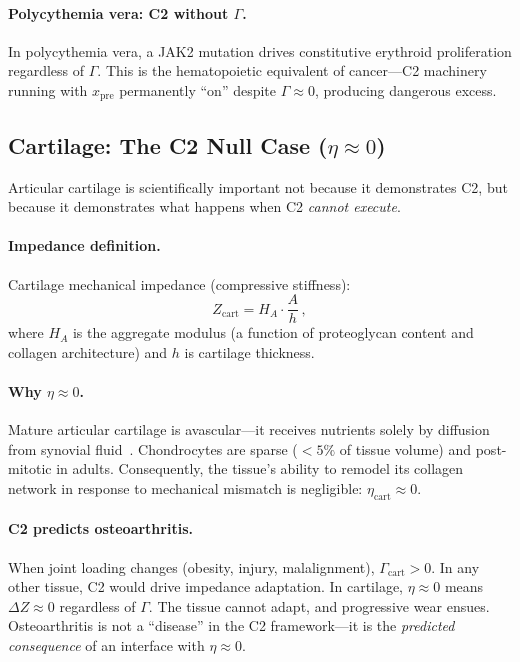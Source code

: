 \documentclass[aps,pre,twocolumn,superscriptaddress,floatfix]{revtex4-2}
\begin{document}
\paragraph{Polycythemia vera: C2 without $\Gamma$.}
In polycythemia vera, a JAK2 mutation drives
constitutive erythroid proliferation
regardless of $\Gamma$.
This is the hematopoietic equivalent of
cancer---C2 machinery running with
$x_{\text{pre}}$ permanently ``on'' despite
$\Gamma \approx 0$, producing dangerous
excess.


\subsection{Cartilage: The C2 Null Case ($\eta \approx 0$)}
\label{sec:cartilage}

Articular cartilage is scientifically important
not because it demonstrates C2, but because it
demonstrates what happens when C2 \emph{cannot execute}.

\paragraph{Impedance definition.}
Cartilage mechanical impedance (compressive stiffness):
\begin{equation}
  Z_{\text{cart}} = H_A \cdot \frac{A}{h}\,,
  \label{eq:z-cart}
\end{equation}
where $H_A$ is the aggregate modulus (a function of
proteoglycan content and collagen architecture) and
$h$ is cartilage thickness.

\paragraph{Why $\eta \approx 0$.}
Mature articular cartilage is avascular---it receives
nutrients solely by diffusion from synovial
fluid~\cite{Buckwalter2004}.
Chondrocytes are sparse ($< 5\%$ of tissue volume)
and post-mitotic in adults.
Consequently, the tissue's ability to remodel its
collagen network in response to mechanical mismatch
is negligible: $\eta_{\text{cart}} \approx 0$.

\paragraph{C2 predicts osteoarthritis.}
When joint loading changes (obesity, injury,
malalignment), $\Gamma_{\text{cart}} > 0$.
In any other tissue, C2 would drive impedance
adaptation.  In cartilage, $\eta \approx 0$
means $\Delta Z \approx 0$ regardless of $\Gamma$.
The tissue cannot adapt, and progressive
wear ensues.  Osteoarthritis is not a ``disease''
in the C2 framework---it is the \emph{predicted
consequence} of an interface with $\eta \approx 0$.
\end{document}
